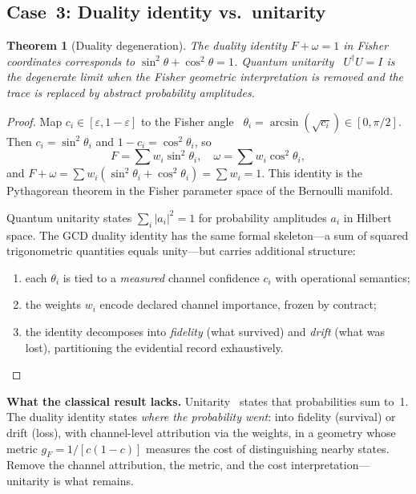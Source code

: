 \documentclass[
  aps,
  prd,
  twocolumn,
  superscriptaddress,
  nofootinbib,
  floatfix
]{revtex4-2}
\newtheorem{theorem}{Theorem}
\newcommand{\eps}{\varepsilon}
\newcommand{\beq}{\begin{equation}}
\newcommand{\eeq}{\end{equation}}
\begin{document}
\subsection{Case~3: Duality identity vs.\ unitarity}

\begin{theorem}[Duality degeneration]
\label{thm:duality_deg}
The duality identity $F + \omega = 1$ in Fisher coordinates
corresponds to $\sin^2\theta + \cos^2\theta = 1$.
Quantum unitarity~\cite{dirac1930principles,vonforthcoming,weinberg1995qft1}
$U^\dagger U = I$ is the degenerate limit when the Fisher
geometric interpretation is removed and the trace is replaced
by abstract probability amplitudes.
\end{theorem}

\begin{proof}
Map $c_i \in [\eps, 1{-}\eps]$ to the Fisher
angle~\cite{fisher1925,amari2016information}
$\theta_i = \arcsin(\sqrt{c_i}) \in [0, \pi/2]$.  Then
$c_i = \sin^2\theta_i$ and $1 - c_i = \cos^2\theta_i$, so
\beq
  F = \sum w_i \sin^2\!\theta_i, \quad
  \omega = \sum w_i \cos^2\!\theta_i,
\eeq
and $F + \omega = \sum w_i(\sin^2\!\theta_i +
\cos^2\!\theta_i) = \sum w_i = 1$.  This identity is
the Pythagorean theorem in the Fisher parameter space of
the Bernoulli manifold.

Quantum unitarity states $\sum_i |a_i|^2 = 1$ for
probability amplitudes $a_i$ in Hilbert space.  The GCD
duality identity has the same formal skeleton---a sum of
squared trigonometric quantities equals unity---but carries
additional structure:
\begin{enumerate}[leftmargin=*,label=(\alph*)]
\item each $\theta_i$ is tied to a \emph{measured}
  channel confidence $c_i$ with operational semantics;
\item the weights $w_i$ encode declared channel
  importance, frozen by contract;
\item the identity decomposes into \emph{fidelity}
  (what survived) and \emph{drift} (what was lost),
  partitioning the evidential record exhaustively.
\end{enumerate}
\end{proof}

\noindent\textbf{What the classical result lacks.}
Unitarity~\cite{dirac1930principles,weinberg1995qft1} states
that probabilities sum to~1.  The duality identity states
\emph{where the probability went}: into fidelity (survival)
or drift (loss), with channel-level attribution via the
weights, in a geometry whose metric
$g_F = 1/[c(1{-}c)]$ measures the cost of distinguishing
nearby states.  Remove the channel attribution, the metric,
and the cost interpretation---unitarity is what remains.
\end{document}
